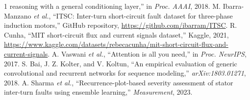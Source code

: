 \documentclass[journal]{IEEEtran}
\begin{document}
\begin{thebibliography}{1}
reasoning with a general conditioning layer,'' in \emph{Proc. AAAI}, 2018.
 M. Ibarra-Manzano \emph{et al.}, ``ITSC: Inter-turn short-circuit fault dataset
for three-phase induction motors,'' GitHub repository, \url{https://github.com/ibarram/ITSC}.
 R. Cunha, ``MIT short-circuit flux and current signals dataset,'' Kaggle, 2021,
\url{https://www.kaggle.com/datasets/rebecacunha/mit-short-circuit-flux-and-current-signals}.
 A. Vaswani \emph{et al.}, ``Attention is all you need,'' in \emph{Proc.
NeurIPS}, 2017.
 S. Bai, J. Z. Kolter, and V. Koltun, ``An empirical evaluation of generic
convolutional and recurrent networks for sequence modeling,'' \emph{arXiv:1803.01271}, 2018.
 A. Sharma \emph{et al.}, ``Recurrence-plot-based severity assessment of stator
inter-turn faults using ensemble learning,'' \emph{Measurement}, 2023.
\end{thebibliography}
\end{document}
